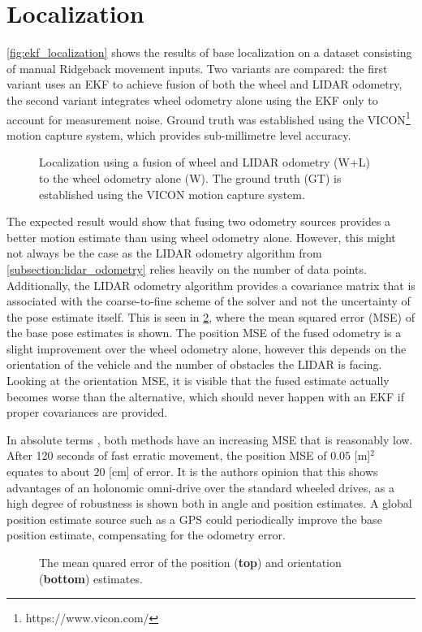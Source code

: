 \documentclass[times, utf8, diplomski, english]{fer}
\begin{document}
\section{Localization}
\autoref{fig:ekf_localization} shows the results of base localization on a dataset consisting of manual Ridgeback movement inputs.
Two variants are compared: the first variant  uses an EKF to achieve fusion of both the wheel and LIDAR odometry, the second variant integrates wheel odometry alone using the EKF only to account for measurement noise.
Ground truth was established using the VICON\footnote{https://www.vicon.com/} motion capture system, which provides sub-millimetre level accuracy.
\begin{figure}[h]
\centering

\caption{Localization using a fusion of wheel and LIDAR odometry (W+L) to the wheel odometry alone (W). The ground truth (GT) is established using the VICON motion capture system.}
\label{fig:ekf_localization}
\end{figure}

The expected result would show that fusing two odometry sources provides a better motion estimate than using wheel odometry alone. 
However, this might not always be the case as the LIDAR odometry algorithm from \autoref{subsection:lidar_odometry} relies heavily on the number of data points.
Additionally, the LIDAR odometry algorithm provides a covariance matrix that is associated with the coarse-to-fine scheme of the solver and not the uncertainty of the pose estimate itself.
This is seen in \ref{fig:mse_localization}, where the mean squared error (MSE) of the base pose estimates is shown.
The position MSE of the fused odometry is a slight improvement over the wheel odometry alone, however this depends on the orientation of the vehicle and the number of obstacles the LIDAR is facing.
Looking at the orientation MSE, it is visible that the fused estimate actually becomes worse than the alternative, which should never happen with an EKF if proper covariances are provided.

In absolute terms , both methods have an increasing MSE that is reasonably low. 
After 120 seconds of fast erratic movement, the position MSE of $0.05$ [m]$^2$ equates to about $20$ [cm] of error.
It is the authors opinion that this shows advantages of an holonomic omni-drive over the standard wheeled drives, as a high degree of robustness is shown both in angle and position estimates.
A global position estimate source such as a GPS could periodically improve the base position estimate, compensating for the odometry error.
\begin{figure}[h]
\centering

\caption{The mean quared error of the position (\textbf{top}) and orientation (\textbf{bottom}) estimates. }
\label{fig:mse_localization}
\end{figure}
\end{document}
